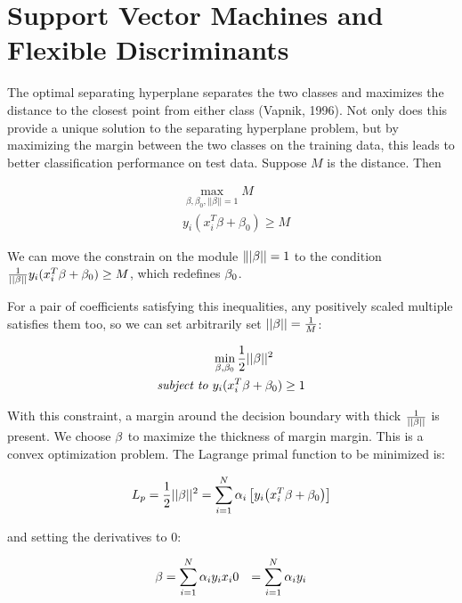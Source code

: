 
\section{Support Vector Machines and Flexible Discriminants}
The optimal separating hyperplane separates the two classes and maximizes the distance to the closest point from either class (Vapnik, 1996). Not only does this provide a unique solution to the separating hyperplane problem, but by maximizing the margin between the two classes on the training data, this leads to better classification performance on test data.
\iffalse
Suppose $M$ is the distance. Then

\begin{equation}
\begin{aligned}
&\max\limits_{\beta,\beta_0, ||\beta||=1} M \\
& y_i(x_i^T\beta + \beta_0) \ge M
\end{aligned}
\end{equation}

We  can move the constrain on the module $\||\mathbf{\beta}||=1$ to the condition $\frac{1}{||\mathbf{\beta}||}y_i(x_i^T\beta + \beta_0) \ge M$, which redefines $\mathbf{\beta}_0$. 

For a pair of coefficients satisfying this inequalities, any positively scaled multiple satisfies them too, so we can set arbitrarily set $||\mathbf{\beta}||=\frac{1}{M}$:

\begin{equation}
\begin{aligned}
&\min_{\mathbf{\beta}, \mathbf{\beta}_0}{\frac{1}{2}||\mathbf{\beta}||^2}\\
\textit{subject to } &y_i(x_i^T\mathbf{\beta}+\mathbf{\beta}_0)\ge1
\end{aligned}
\end{equation}

With this constraint, a margin around the decision boundary with thick $\frac{1}{||\mathbf{\beta}||}$ is present. We choose $\mathbf{\beta}$ to maximize the thickness of margin margin.  This is a convex optimization problem. The Lagrange primal function to be minimized is:

\begin{equation}
\label{eq}
L_p = \frac{1}{2} ||\be||^2 = \sum_{i=1}^N \alpha_i\left[ y_i \br{x_i^T\be+\be_0}\right]

\end{equation}

and setting the derivatives to $0$:

\begin{equation}
\begin{aligned}
\mathbf{\beta} &= \sum_{i=1}^N \alpha_i y_i x_i
0  &= \sum_{i=1}^N \alpha_i y_i
\end{aligned}
\end{equation}

